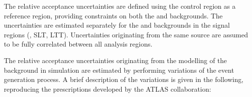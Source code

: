 

The relative acceptance uncertainties are defined using the \ZHF
control region as a reference region, providing constraints on both
the \ZHF and \ttbar backgrounds. The uncertainties are estimated
separately for the \ZHF and \ttbar backgrounds in the signal regions
(\hadhad, \lephad SLT, \lephad LTT). Uncertainties originating from
the same source are assumed to be fully correlated between all
analysis regions.

The relative acceptance uncertainties originating from the modelling
of the \ZHF background in simulation are estimated by performing
variations of the event generation process. A brief description of the
variations is given in the following, reproducing the prescriptions
developed by the ATLAS collaboration:
